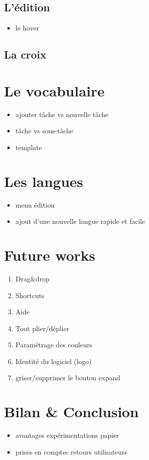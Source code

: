 \documentclass[11pt]{article}
\begin{document}
\subsection{L'édition}
\begin{itemize}
\item le hover
\end{itemize}


\subsection{La croix}


\section{Le vocabulaire}

\begin{itemize}
\item ajouter tâche vs nouvelle tâche
\item tâche vs sous-tâche
\item template
\end{itemize}


\section{Les langues}
\begin{itemize}
\item menu édition
\item ajout d'une nouvelle langue rapide et facile
\end{itemize}


\section{Future works}
\begin{enumerate}
\item Drag\&drop
\item Shortcuts
\item Aide
\item Tout plier/déplier
\item Paramétrage des couleurs
\item Identité du logiciel (logo)
\item griser/supprimer le bouton expand
\end{enumerate}


\section{Bilan \& Conclusion}
\begin{itemize}
\item avantages expérimentations papier
\item prises en comptes retours utilisateurs
\end{itemize}
\end{document}
